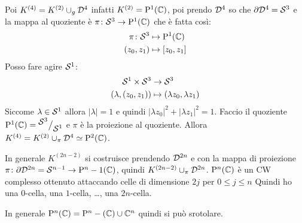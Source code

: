 Poi $ K^{(4)} = K^{(2)} \cup_g \mathcal{D}^{4} $ infatti $ K^{(2)} = \mathrm{P}^1 (\mathbb{C}) $, poi prendo $ \mathcal{D}^{4} $
so che $ \partial \mathcal{D}^{4} = \mathcal{S}^{3} $ e la mappa al quoziente è $ \pi \colon \mathcal{S}^{3} \to \mathrm{P}^1 (\mathbb{C}) $
che è fatta così:
\begin{align*}
  \pi \colon \mathcal{S}^{3} & \mapsto \mathrm{P}^1 (\mathbb{C}) \\
  (z_0, z_1) & \mapsto [z_0, z_1]
\end{align*}
Posso fare agire $ \mathcal{S}^{1} $:
\begin{align*}
  \mathcal{S}^{1} \times \mathcal{S}^{3} & \to \mathcal{S}^{3} \\
  (\lambda, (z_0, z_1)) & \mapsto (\lambda z_0, \lambda z_1)
\end{align*}
Siccome $ \lambda \in \mathcal{S}^{1} $ allora $ | \lambda | = 1 $ e quindi $ | \lambda z_0 |^2 + | \lambda z_1 |^2 = 1 $.
Faccio il quoziente $ \mathrm{P}^1 (\mathbb{C}) = {^{\textstyle \mathcal{S}^{3}}\big/_{\textstyle \mathcal{S}^{1}}} $ e $ \pi $ è la proiezione al
quoziente. Allora $ K^{(4)} = K^{(2)} \cup_\pi \mathcal{D}^{4} \simeq \mathrm{P}^2 (\mathbb{C}) $.

In generale $ K^{(2n - 2)} $ si costruisce prendendo $ \mathcal{D}^{2n} $ e con la mappa
di proiezione $ \pi \colon \partial \mathcal{D}^{2n} = \mathcal{S}^{n-1} \to \mathrm{P}^n-1 (\mathbb{C}) $, quindi $ K^{(2n -2)} \cup_\pi \mathcal{D}^{2n} $.
$ \mathrm{P}^n (\mathbb{C}) $ è un CW complesso ottenuto attaccando celle di dimensione $ 2j $ per $ 0 \leq j \leq n $
Quindi ho una $ 0 $-cella, una $ 1 $-cella, \dots, una $ 2n $-cella.

\begin{osservation}
  In generale $ \mathrm{P}^n (\mathbb{C}) = \mathrm{P}^n- (\mathbb{C}) \cup \mathbb{C}^n $ quindi si può srotolare.
\end{osservation}

